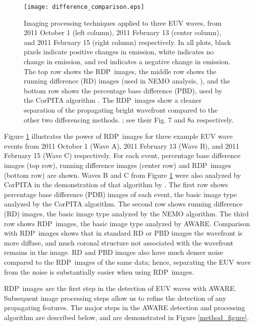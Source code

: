 \documentclass[namedreferences]{solarphysics}
\newcommand{\RDP}{RDP}
\begin{document}
\begin{article}
\begin{figure}
\begin{center}
\texttt{[image: difference\_comparison.eps]}
\caption{Imaging processing techniques applied to three EUV waves,
  from 2011 October 1 (left column), 2011 February 13 (center column),
  and 2011 February 15 (right column) respectively. In all plots,
  black pixels indicate positive changes in emission, white indicates
  no change in emission, and red indicates a negative change in
  emission. The top row shows the \RDP\ images, the middle row shows
  the running difference (RD) images (used in NEMO analysis,
  \citep{2005SoPh..228..265P}), and the bottom row shows the
  percentage base difference (PBD), used by the CorPITA algorithm
  \citep{2014SoPh..289.3279L}.  The \RDP\ images show a cleaner
  separation of the propagating bright wavefront compared to the other
  two differencing methods.  \cite{2014SoPh..289.3279L}; see their
  Fig. 7 and 8a respectively.}
\label{rpdm_figure}
\end{center}
\end{figure}

Figure \ref{rpdm_figure} illustrates the power of \RDP\ images for
three example EUV wave events from 2011 October 1 (Wave A), 2011
February 13 (Wave B), and 2011 February 15 (Wave C) respectively. For
each event, percentage base difference images (top row), running
difference images (center row) and \RDP\ images (bottom row) are
shown. Waves B and C from Figure \ref{rpdm_figure} were also analyzed
by CorPITA in the demonstration of that algorithm by
\citet{2014SoPh..289.3279L}.  The first row shows percentage base
difference (PDB) images of each event, the basic image type analyzed
by the CorPITA algorithm.  The second row shows running difference
(RD) images, the basic image type analyzed by the NEMO algorithm.  The
third row shows \RDP\ images, the basic image type analyzed by
AWARE. Comparison with \RDP\ images shows that in standard RD or PBD
images the wavefront is more diffuse, and much coronal structure not
associated with the wavefront remains in the image. RD and PBD images
also have much denser noise compared to the \RDP\ images of the same
data; hence, separating the EUV wave from the noise is substantially
easier when using \RDP\ images.

\RDP\ images are the first step in the detection of EUV waves with
AWARE. Subsequent image processing steps allow us to refine the
detection of any propagating features. The major steps in the AWARE
detection and processing algorithm are described below, and are
demonstrated in Figure \ref{method_figure}.


\end{article}
\end{document}
